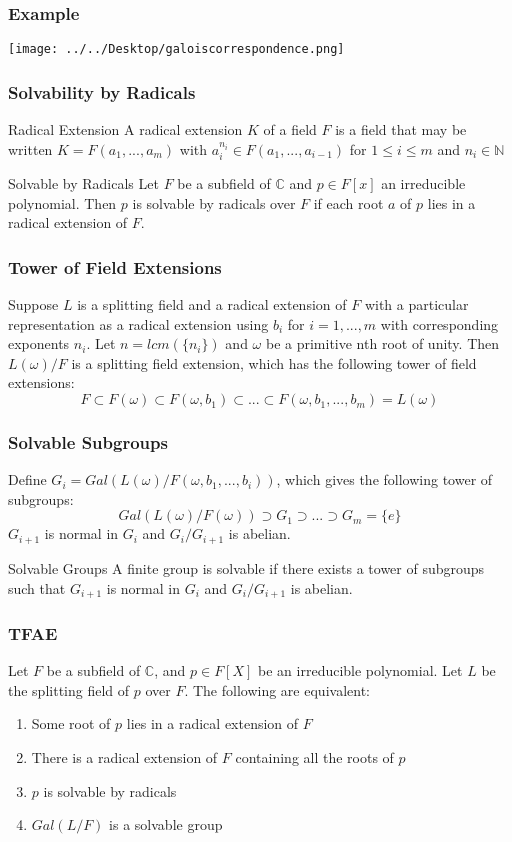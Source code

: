 \documentclass{beamer}
\begin{document}
\begin{frame}
\frametitle{Example}
\texttt{[image: ../../Desktop/galoiscorrespondence.png]} 
 \end{frame}
 
 \begin{frame}
\frametitle{Solvability by Radicals}
\begin{block}{Radical Extension}
A radical extension $K$ of a field $F$ is a field that may be written $K=F(a_1,...,a_m)$ with $a_i^{n_i} \in F(a_1,...,a_{i-1})$ for $1 \leq i \leq m$ and $n_i \in \mathbb{N}$\\
\end{block}
\begin{block}{Solvable by Radicals}
Let $F$ be a subfield of $\mathbb{C}$ and $p \in F[x]$ an irreducible polynomial. Then $p$ is solvable by radicals over $F$ if each root $a$ of $p$ lies in a radical extension of $F$.
\end{block}
 \end{frame}
 
  \begin{frame}
\frametitle{Tower of Field Extensions}
Suppose $L$ is a splitting field and a radical extension of $F$ with a particular representation as a radical extension using $b_i$ for $i=1,...,m$ with corresponding exponents $n_i$. Let $n=lcm(\{n_i\})$ and $\omega$ be a primitive nth root of unity. Then $L(\omega)/F$ is a splitting field extension, which has the following tower of field extensions:
$$F \subset F(\omega) \subset F(\omega, b_1) \subset ... \subset F(\omega, b_1, ... , b_m) = L(\omega)$$
 \end{frame}
 
  \begin{frame}
\frametitle{Solvable Subgroups}
Define $G_i=Gal(L(\omega)/F(\omega, b_1, ..., b_i))$, which gives the following tower of subgroups:
$$Gal(L(\omega)/F(\omega)) \supset G_1  \supset ... \supset G_m = \{e\}$$
$G_{i+1}$ is normal in $G_i$ and $G_i/G_{i+1}$ is abelian.
\begin{block}{Solvable Groups}
A finite group is solvable if there exists a tower of subgroups such that $G_{i+1}$ is normal in $G_i$ and $G_i/G_{i+1}$ is abelian. 
\end{block}
 \end{frame}
 
 \begin{frame}
\frametitle{TFAE}
Let $F$ be a subfield of $\mathbb{C}$, and $p \in F[X]$ be an irreducible polynomial. Let $L$ be the splitting field of $p$ over $F$. The following are equivalent:
\begin{enumerate}
\item Some root of $p$ lies in a radical extension of $F$
\item There is a radical extension of $F$ containing all the roots of $p$
\item $p$ is solvable by radicals
\item $Gal(L/F)$ is a solvable group
\end{enumerate}
 \end{frame}
 
\end{document}
